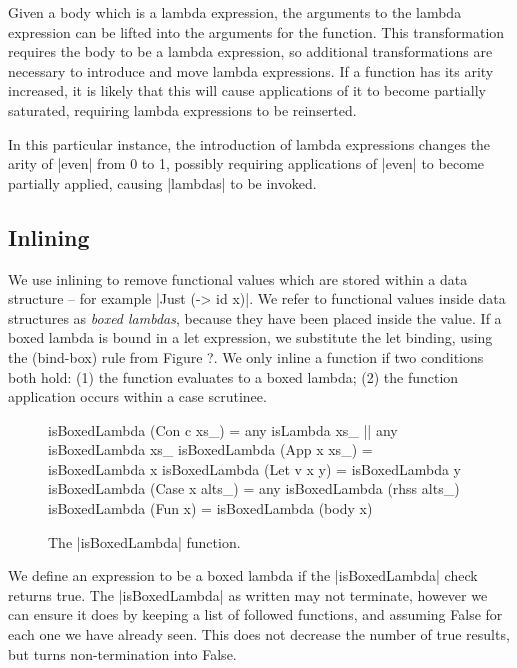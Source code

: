 \documentclass[preprint]{sigplanconf}
\begin{document}
Given a body which is a lambda expression, the arguments to the lambda expression can be lifted into the arguments for the function. This transformation requires the body to be a lambda expression, so additional transformations are necessary to introduce and move lambda expressions. If a function has its arity increased, it is likely that this will cause applications of it to become partially saturated, requiring lambda expressions to be reinserted.

In this particular instance, the introduction of lambda expressions changes the arity of |even| from 0 to 1, possibly requiring applications of |even| to become partially applied, causing |lambdas| to be invoked.


\subsection{Inlining}

We use inlining to remove functional values which are stored within a data structure -- for example |Just (\x -> id x)|. We refer to functional values inside data structures as \textit{boxed lambdas}, because they have been placed inside the value. If a boxed lambda is bound in a let expression, we substitute the let binding, using the (bind-box) rule from Figure ?. We only inline a function if two conditions both hold: (1) the function evaluates to a boxed lambda; (2) the function application occurs within a case scrutinee.

\begin{figure}
\begin{code}
isBoxedLambda (Con c xs_) = any isLambda xs_ || any isBoxedLambda xs_
isBoxedLambda (App x xs_) = isBoxedLambda x
isBoxedLambda (Let v x y) = isBoxedLambda y
isBoxedLambda (Case x alts_) = any isBoxedLambda (rhss alts_)
isBoxedLambda (Fun x) = isBoxedLambda (body x)
\end{code}
\caption{The |isBoxedLambda| function.}
\label{fig:boxed_lambda}
\end{figure}

We define an expression to be a boxed lambda if the |isBoxedLambda| check returns true. The |isBoxedLambda| as written may not terminate, however we can ensure it does by keeping a list of followed functions, and assuming False for each one we have already seen. This does not decrease the number of true results, but turns non-termination into False.
\end{document}
